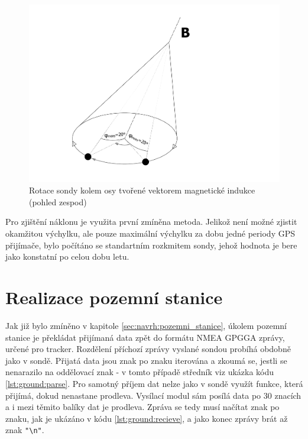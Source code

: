 \documentclass[twoside]{ctuthesis}
\theoremstyle{plain}
\theoremstyle{definition}
\theoremstyle{note}
\begin{document}
		\begin{figure}[hbtp]
			\centering
			\includegraphics[width=.5\textwidth]{Figures/sonda_naklon_mag_osova_rotace.pdf}
			\caption{Rotace sondy kolem osy tvořené vektorem magnetické indukce (pohled zespod)}
			\label{fig:sonda:mag:rot}
		\end{figure}

		Pro zjištění náklonu je využita první zmíněna metoda. Jelikož není možné zjistit okamžitou výchylku, ale pouze maximální výchylku za dobu jedné periody GPS přijímače, bylo počítáno se standartním rozkmitem sondy, jehož hodnota je bere jako konstatní po celou dobu letu. 
		


	












	
	\section{Realizace pozemní stanice}

	Jak již bylo zmíněno v kapitole \ref{sec:navrh:pozemni_stanice}, úkolem pozemní stanice je překládat přijímaná data zpět do formátu NMEA GPGGA zprávy, určené pro tracker. Rozdělení příchozí zprávy vyslané sondou probíhá obdobně jako v sondě. Přijatá data jsou znak po znaku iterována a zkoumá se, jestli se nenarazilo na oddělovací znak - v tomto případě středník viz ukázka kódu \ref{lst:ground:parse}. Pro samotný příjem dat nelze jako v sondě využít funkce, která přijímá, dokud nenastane prodleva. Vysílací modul sám posílá data po 30 znacích a i mezi těmito balíky dat je prodleva. Zpráva se tedy musí načítat znak po znaku, jak je ukázáno v kódu \ref{lst:ground:recieve}, a jako konec zprávy brát až znak \lstinline |"\n"|.
\end{document}
